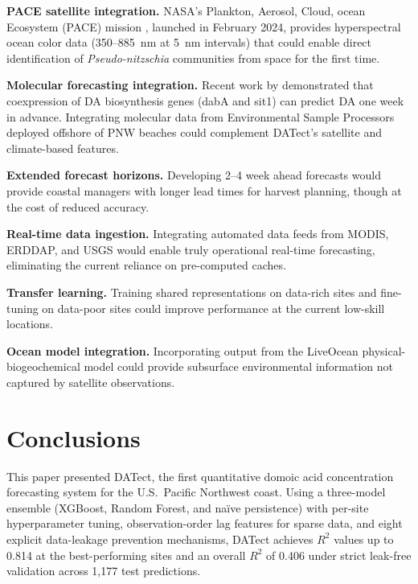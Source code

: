 \documentclass[preprint,12pt,authoryear]{elsarticle}
\begin{document}
\textbf{PACE satellite integration.} NASA's Plankton, Aerosol, Cloud, ocean Ecosystem (PACE) mission \citep{Werdell2019}, launched in February 2024, provides hyperspectral ocean color data (350--885~nm at 5~nm intervals) that could enable direct identification of \textit{Pseudo-nitzschia} communities from space for the first time.

\textbf{Molecular forecasting integration.} Recent work by \citet{Brunson2024} demonstrated that coexpression of DA biosynthesis genes (dabA and sit1) can predict DA one week in advance. Integrating molecular data from Environmental Sample Processors deployed offshore of PNW beaches could complement DATect's satellite and climate-based features.

\textbf{Extended forecast horizons.} Developing 2--4 week ahead forecasts would provide coastal managers with longer lead times for harvest planning, though at the cost of reduced accuracy.

\textbf{Real-time data ingestion.} Integrating automated data feeds from MODIS, ERDDAP, and USGS would enable truly operational real-time forecasting, eliminating the current reliance on pre-computed caches.

\textbf{Transfer learning.} Training shared representations on data-rich sites and fine-tuning on data-poor sites could improve performance at the current low-skill locations.

\textbf{Ocean model integration.} Incorporating output from the LiveOcean physical-biogeochemical model \citep{MacCready2021} could provide subsurface environmental information not captured by satellite observations.


\section{Conclusions}
\label{sec:conclusions}

This paper presented DATect, the first quantitative domoic acid concentration forecasting system for the U.S.\ Pacific Northwest coast. Using a three-model ensemble (XGBoost, Random Forest, and na\"ive persistence) with per-site hyperparameter tuning, observation-order lag features for sparse data, and eight explicit data-leakage prevention mechanisms, DATect achieves $R^2$ values up to 0.814 at the best-performing sites and an overall $R^2$ of 0.406 under strict leak-free validation across 1,177 test predictions.
\end{document}

